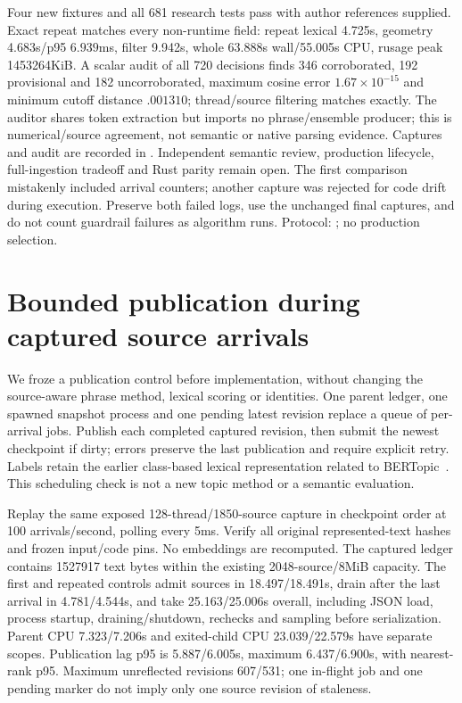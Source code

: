 \documentclass[11pt]{article}
\begin{document}
Four new fixtures and all 681 research tests pass with author references supplied.
Exact repeat matches every non-runtime field: repeat lexical 4.725s,
geometry 4.683s/p95 $6.939$ms, filter 9.942s, whole 63.888s wall/55.005s CPU,
rusage peak 1453264KiB. A scalar audit of all 720 decisions finds 346 corroborated,
192 provisional and 182 uncorroborated, maximum cosine error $1.67\times10^{-15}$
and minimum cutoff distance $.001310$; thread/source filtering matches exactly.
The auditor shares token extraction but imports no phrase/ensemble producer;
this is numerical/source agreement, not semantic or native parsing evidence.
Captures and audit are recorded in
. Independent semantic review,
production lifecycle, full-ingestion tradeoff and Rust parity remain open.
The first comparison mistakenly included arrival counters; another capture was
rejected for code drift during execution. Preserve both failed logs, use the
unchanged final captures, and do not count guardrail failures as algorithm runs.
Protocol: ; no production selection.

\section{Bounded publication during captured source arrivals}
We froze a publication control before implementation, without changing the
source-aware phrase method, lexical scoring or identities. One parent ledger,
one spawned snapshot process and one pending latest revision replace a queue of
per-arrival jobs. Publish each completed captured revision, then submit the
newest checkpoint if dirty; errors preserve the last publication and require
explicit retry. Labels retain the earlier class-based lexical representation
related to BERTopic~\cite{bertopic}. This scheduling check is not a new topic
method or a semantic evaluation.

Replay the same exposed 128-thread/1850-source capture in checkpoint order at
100 arrivals/second, polling every 5ms. Verify all original represented-text hashes
and frozen input/code pins. No embeddings are recomputed. The captured ledger
contains 1527917 text bytes within the existing 2048-source/8MiB capacity.
The first and repeated controls admit sources in 18.497/18.491s, drain after the
last arrival in 4.781/4.544s, and take 25.163/25.006s overall, including JSON load,
process startup, draining/shutdown, rechecks and sampling before serialization.
Parent CPU 7.323/7.206s and exited-child CPU 23.039/22.579s have separate scopes.
Publication lag p95 is 5.887/6.005s, maximum 6.437/6.900s, with nearest-rank p95.
Maximum unreflected revisions 607/531; one in-flight job and one pending marker
do not imply only one source revision of staleness.
\end{document}
